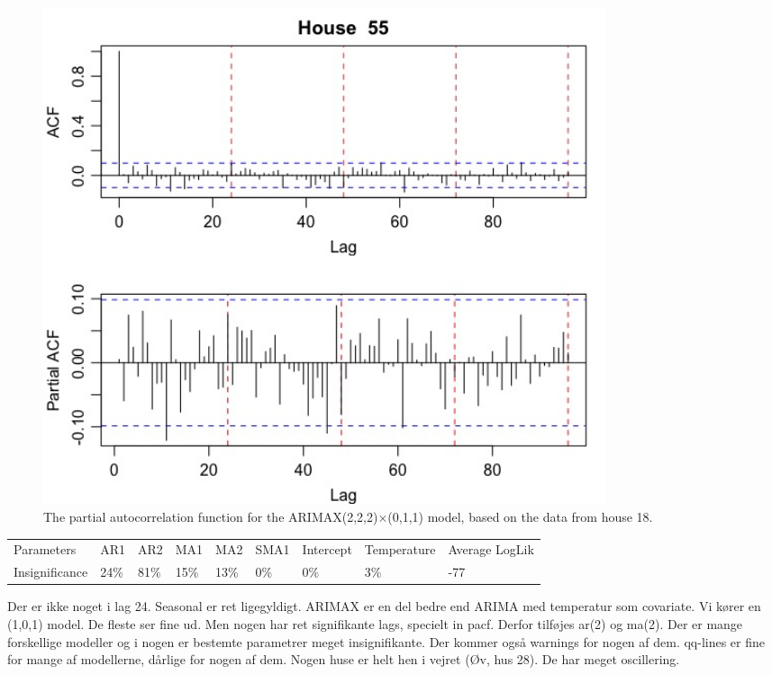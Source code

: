 \begin{figure}
    \centering
    \includegraphics[width=0.8\textwidth]{../../../figures/arimax/Arimax1_55.jpeg}
    \caption{The partial autocorrelation function for the ARIMAX(2,2,2)$\times$(0,1,1) model, based on the data from house 18.}
    \label{arimax1_55}
\end{figure}

\begin{table}[]
    \begin{tabular}{lllllllll}
    Parameters     & AR1  & AR2  & MA1  & MA2  & SMA1 & Intercept & Temperature & Average LogLik \\
    Insignificance & 24\% & 81\% & 15\% & 13\% & 0\%  & 0\%       & 3\%         & -77           
    \end{tabular}
    \end{table}

Der er ikke noget i lag 24. Seasonal er ret ligegyldigt.
ARIMAX er en del bedre end ARIMA med temperatur som covariate.
Vi kører en (1,0,1) model. De fleste ser fine ud. Men nogen har ret signifikante lags, specielt in pacf.
Derfor tilføjes ar(2) og ma(2). Der er mange forskellige modeller og i nogen er bestemte parametrer meget insignifikante.
Der kommer også warnings for nogen af dem.
qq-lines er fine for mange af modellerne, dårlige for nogen af dem.
Nogen huse er helt hen i vejret (Øv, hus 28). De har meget oscillering.
